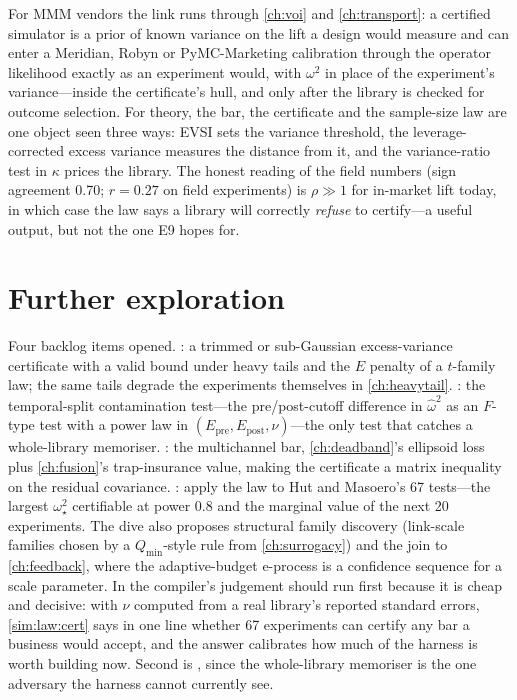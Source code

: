 For MMM vendors the link runs through \cref{ch:voi} and \cref{ch:transport}: a certified simulator is a prior of known variance on the lift a design would measure and can enter a Meridian, Robyn or PyMC-Marketing calibration through the operator likelihood exactly as an experiment would, with $\omega^2$ in place of the experiment's variance---inside the certificate's hull, and only after the library is checked for outcome selection. For theory, the bar, the certificate and the sample-size law are one object seen three ways: EVSI sets the variance threshold, the leverage-corrected excess variance measures the distance from it, and the variance-ratio test in $\kappa$ prices the library. The honest reading of the field numbers (sign agreement 0.70; $r = 0.27$ on field experiments) is $\rho \gg 1$ for in-market lift today, in which case the law says a library will correctly \emph{refuse} to certify---a useful output, but not the one E9 hopes for.

\section{Further exploration}

Four backlog items opened. : a trimmed or sub-Gaussian excess-variance certificate with a valid bound under heavy tails and the $E$ penalty of a $t$-family law; the same tails degrade the experiments themselves in \cref{ch:heavytail}. : the temporal-split contamination test---the pre/post-cutoff difference in $\hat\omega^2$ as an $F$-type test with a power law in $(E_{\mathrm{pre}}, E_{\mathrm{post}}, \nu)$---the only test that catches a whole-library memoriser. : the multichannel bar, \cref{ch:deadband}'s ellipsoid loss plus \cref{ch:fusion}'s trap-insurance value, making the certificate a matrix inequality on the residual covariance. : apply the law to Hut and Masoero's 67 tests---the largest $\omega_\star^2$ certifiable at power 0.8 and the marginal value of the next 20 experiments. The dive also proposes structural family discovery (link-scale families chosen by a $Q_{\min}$-style rule from \cref{ch:surrogacy}) and the join to \cref{ch:feedback}, where the adaptive-budget e-process is a confidence sequence for a scale parameter. In the compiler's judgement  should run first because it is cheap and decisive: with $\nu$ computed from a real library's reported standard errors, \cref{sim:law:cert} says in one line whether 67 experiments can certify any bar a business would accept, and the answer calibrates how much of the harness is worth building now. Second is , since the whole-library memoriser is the one adversary the harness cannot currently see.

